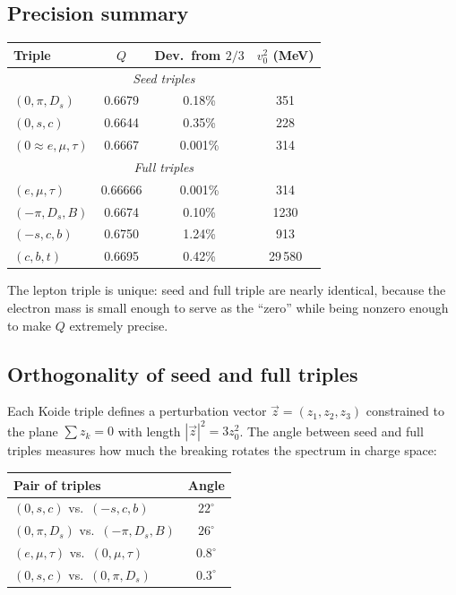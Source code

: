\documentclass[12pt,a4paper]{article}
\begin{document}
\subsection{Precision summary}

\begin{center}
\begin{tabular}{lccc}
\toprule
Triple & $Q$ & Dev.\ from $2/3$ & $v_0^2$ (MeV) \\
\midrule
\multicolumn{4}{c}{\textit{Seed triples}} \\
$(0, \pi, D_s)$ & 0.6679 & 0.18\% & 351 \\
$(0, s, c)$ & 0.6644 & 0.35\% & 228 \\
$(0 \approx e, \mu, \tau)$ & 0.6667 & 0.001\% & 314 \\
\midrule
\multicolumn{4}{c}{\textit{Full triples}} \\
$(e, \mu, \tau)$ & 0.66666 & 0.001\% & 314 \\
$(-\pi, D_s, B)$ & 0.6674 & 0.10\% & 1230 \\
$(-s, c, b)$ & 0.6750 & 1.24\% & 913 \\
$(c, b, t)$ & 0.6695 & 0.42\% & 29\,580 \\
\bottomrule
\end{tabular}
\end{center}

The lepton triple is unique: seed and full triple are nearly 
identical, because the electron mass is small enough to serve as 
the ``zero'' while being nonzero enough to make $Q$ extremely 
precise.

\subsection{Orthogonality of seed and full triples}

Each Koide triple defines a perturbation vector 
$\vec{z} = (z_1, z_2, z_3)$ constrained to the plane $\sum z_k = 0$ 
with length $|\vec{z}|^2 = 3z_0^2$. The angle between seed and 
full triples measures how much the breaking rotates the spectrum 
in charge space:

\begin{center}
\begin{tabular}{lc}
\toprule
Pair of triples & Angle \\
\midrule
$(0,s,c)$ vs.\ $(-s,c,b)$ & $22^\circ$ \\
$(0,\pi,D_s)$ vs.\ $(-\pi,D_s,B)$ & $26^\circ$ \\
$(e,\mu,\tau)$ vs.\ $(0,\mu,\tau)$ & $0.8^\circ$ \\
$(0,s,c)$ vs.\ $(0,\pi,D_s)$ & $0.3^\circ$ \\
\bottomrule
\end{tabular}
\end{center}
\end{document}
